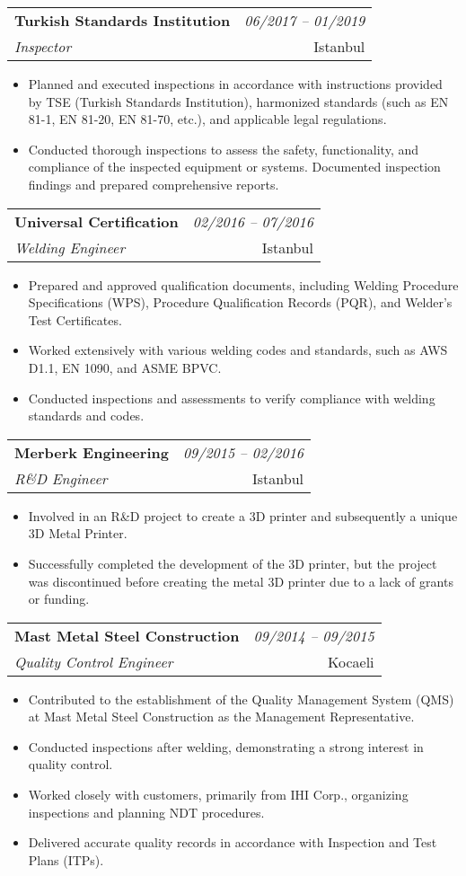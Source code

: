 \documentclass[a4paper,11pt]{article}
\makeatletter
\newcommand{\resumeSubheading}[4]{
\vspace{0.5mm}\item
    \begin{tabular*}{0.98\textwidth}[t]{l@{\extracolsep{\fill}}r}
        \textbf{#1} & \textit{\footnotesize{#4}} \\
        \textit{\footnotesize{#3}} &  \footnotesize{#2}\\
    \end{tabular*}
    \vspace{-2.0mm}
}
\newcommand{\resumeItemListStart}{\begin{justify}\begin{itemize}[leftmargin=3ex, rightmargin=2ex, noitemsep,labelsep=1.2mm,itemsep=0mm]\small}
\newcommand{\resumeItemListEnd}{\end{itemize}\end{justify}\vspace{-2mm}}
\makeatother
\begin{document}
    \resumeSubheading
      {Turkish Standards Institution}{Istanbul}
      {Inspector}{06/2017 -- 01/2019}
        \resumeItemListStart
    \item {Planned and executed inspections in accordance with instructions provided by TSE (Turkish Standards Institution), harmonized standards (such as EN 81-1, EN 81-20, EN 81-70, etc.), and applicable legal regulations.}
    \item {Conducted thorough inspections to assess the safety, functionality, and compliance of the inspected equipment or systems. Documented inspection findings and prepared comprehensive reports.}
        \resumeItemListEnd

    \resumeSubheading
      {Universal Certification}{Istanbul}
      {Welding Engineer}{02/2016 -- 07/2016}
        \resumeItemListStart
    \item {Prepared and approved qualification documents, including Welding Procedure Specifications (WPS), Procedure Qualification Records (PQR), and Welder's Test Certificates.}
    \item {Worked extensively with various welding codes and standards, such as AWS D1.1, EN 1090, and ASME BPVC.}
    \item {Conducted inspections and assessments to verify compliance with welding standards and codes.}
        \resumeItemListEnd

    \resumeSubheading
      {Merberk Engineering}{Istanbul}
      {R\&D Engineer}{09/2015 -- 02/2016}
        \resumeItemListStart
    \item {Involved in an R\&D project to create a 3D printer and subsequently a unique 3D Metal Printer.}
    \item {Successfully completed the development of the 3D printer, but the project was discontinued before creating the metal 3D printer due to a lack of grants or funding.}
        \resumeItemListEnd

    \resumeSubheading
      {Mast Metal Steel Construction}{Kocaeli}
      {Quality Control Engineer}{09/2014 -- 09/2015}
        \resumeItemListStart
    \item {Contributed to the establishment of the Quality Management System (QMS) at Mast Metal Steel Construction as the Management Representative.}
    \item {Conducted inspections after welding, demonstrating a strong interest in quality control.}
    \item {Worked closely with customers, primarily from IHI Corp., organizing inspections and planning NDT procedures.}
    \item {Delivered accurate quality records in accordance with Inspection and Test Plans (ITPs).}
        \resumeItemListEnd
\end{document}
